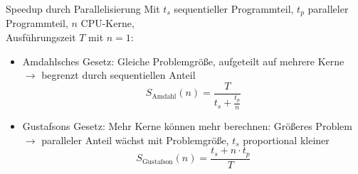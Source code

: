 \begin{frame}[c, fragile]{Speedup durch Parallelisierung}{}
	Mit $t_s$ sequentieller Programmteil, $t_p$ paralleler Programmteil, $n$ CPU-Kerne,\\Ausführungszeit $T$ mit $n=1$:
	\vspace*{\baselineskip}

	\begin{itemize}
		\item Amdahlsches Gesetz:
		      Gleiche Problemgröße, aufgeteilt auf mehrere Kerne\\$\rightarrow$ begrenzt durch sequentiellen Anteil
		      \[S_{\textrm{Amdahl}}(n)=\frac{T}{t_s+\frac{t_p}{n}}\]
		\item Gustafsons Gesetz:
		      Mehr Kerne können mehr berechnen: Größeres Problem\\$\rightarrow$ paralleler Anteil wächst mit Problemgröße, $t_s$ proportional kleiner
		      \[S_{\textrm{Gustafson}}(n)=\frac{t_s+n\cdot t_p}{T}\]
	\end{itemize}
\end{frame}

